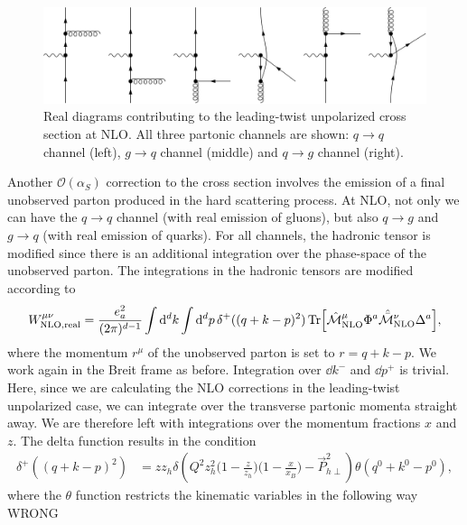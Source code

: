 \begin{figure}
    \centering
    \includegraphics[width=0.95\linewidth]{fig/RealNLOTw2 V2.png}
    \caption{Real diagrams contributing to the leading-twist unpolarized cross section at NLO. All three partonic channels are shown: $q\to q$ channel (left), $g\to q$ channel (middle) and $q \to g$ channel (right). }
    \label{fig:Real NLO tw2}
\end{figure}
Another $\mathcal{O}(\alpha_S)$ correction to the cross section involves the emission of a final unobserved parton produced in the hard scattering process. At NLO, not only we can have the $q \to q$ channel (with real emission of gluons), but also $q \to g$ and $g \to q$ (with real emission of quarks). For all channels, the hadronic tensor is modified since there is an additional integration over the phase-space of the unobserved parton. The integrations in the hadronic tensors are modified according to
\begin{equation}
\begin{aligned}W^{\mu\nu}_{\rm NLO, real}=\frac{e_a^2}{(2\pi)^{d-1}} \int \dd^dk\int \dd^dp\,\delta^+((q+k-p)^2)\Tr[\hat{\mathcal{M}}^\mu_{\rm NLO}\Phi^a \hat{\bar{\mathcal{M}}}^\nu_{\rm NLO}\Delta^a],
\end{aligned}
\end{equation}
where the momentum $r^\mu$ of the unobserved parton is set to $r=q+k-p$. We work again in the Breit frame as before. Integration over $\dd k^-$ and $\dd p^+$ is trivial. Here, since we are calculating the NLO corrections in the leading-twist unpolarized case, we can integrate over the transverse partonic momenta straight away. We are therefore left with integrations over the momentum fractions $x$ and $z$. The delta function results in the condition \cite{koike_transverse_2022} 
\begin{equation}
\begin{aligned}
     \delta^+((q+k-p)^2)&=z z_h\delta\left(Q^2z_h^2\Big(1-\frac{z}{z_h} \Big)\Big(1-\frac{x}{x_B}\Big) - \vec P_{h\perp}^2\right)\theta(q^0+k^0-p^0),
\end{aligned}
\end{equation}
where the $\theta$ function restricts the kinematic variables in the following way WRONG

